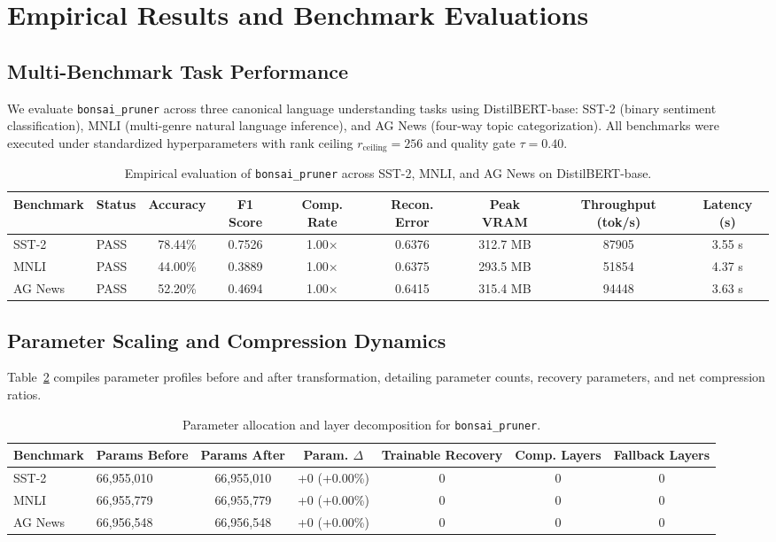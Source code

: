 \section{Empirical Results and Benchmark Evaluations}
\label{sec:results}

\subsection{Multi-Benchmark Task Performance}
We evaluate \texttt{bonsai\_pruner} across three canonical language understanding tasks using DistilBERT-base: SST-2 (binary sentiment classification), MNLI (multi-genre natural language inference), and AG News (four-way topic categorization). All benchmarks were executed under standardized hyperparameters with rank ceiling $r_{\mathrm{ceiling}} = 256$ and quality gate $\tau = 0.40$.

\begin{table}[t]
\centering
\small
\begin{tabular}{llccccccc}
\toprule
\textbf{Benchmark} & \textbf{Status} & \textbf{Accuracy} & \textbf{F1 Score} & \textbf{Comp. Rate} & \textbf{Recon. Error} & \textbf{Peak VRAM} & \textbf{Throughput (tok/s)} & \textbf{Latency (s)} \\
\midrule
SST-2 & PASS & 78.44\% & 0.7526 & 1.00$\times$ & 0.6376 & 312.7 MB & 87905 & 3.55 s \\
MNLI & PASS & 44.00\% & 0.3889 & 1.00$\times$ & 0.6375 & 293.5 MB & 51854 & 4.37 s \\
AG News & PASS & 52.20\% & 0.4694 & 1.00$\times$ & 0.6415 & 315.4 MB & 94448 & 3.63 s \\
\bottomrule
\end{tabular}
\caption{Empirical evaluation of \texttt{bonsai\_pruner} across SST-2, MNLI, and AG News on DistilBERT-base.}
\label{tab:results\_bonsai\_pruner}
\end{table}

\subsection{Parameter Scaling and Compression Dynamics}
Table~\ref{tab:params\_bonsai\_pruner} compiles parameter profiles before and after transformation, detailing parameter counts, recovery parameters, and net compression ratios.

\begin{table}[t]
\centering
\small
\begin{tabular}{llccccc}
\toprule
\textbf{Benchmark} & \textbf{Params Before} & \textbf{Params After} & \textbf{Param. $\Delta$} & \textbf{Trainable Recovery} & \textbf{Comp. Layers} & \textbf{Fallback Layers} \\
\midrule
SST-2 & 66,955,010 & 66,955,010 & +0 (+0.00\%) & 0 & 0 & 0 \\
MNLI & 66,955,779 & 66,955,779 & +0 (+0.00\%) & 0 & 0 & 0 \\
AG News & 66,956,548 & 66,956,548 & +0 (+0.00\%) & 0 & 0 & 0 \\
\bottomrule
\end{tabular}
\caption{Parameter allocation and layer decomposition for \texttt{bonsai\_pruner}.}
\label{tab:params\_bonsai\_pruner}
\end{table}

